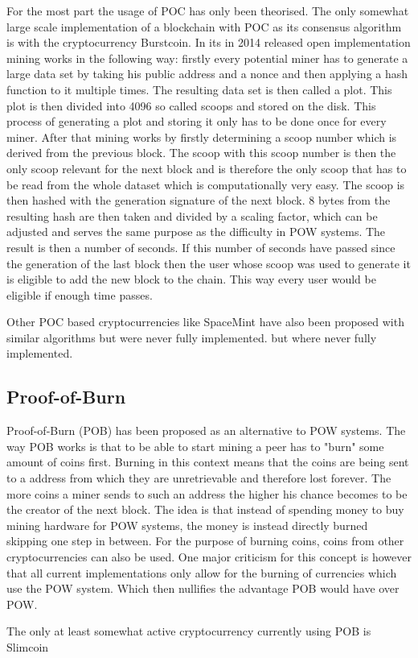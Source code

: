 For the most part the usage of POC has only been theorised. The only somewhat large scale implementation of a blockchain with POC as its consensus algorithm is with the cryptocurrency Burstcoin.
In its in 2014 released open implementation mining works in the following way: firstly every potential miner has to generate a large data set by taking his public address and a nonce and then
applying a hash function to it multiple times. The resulting data set is then called a plot. This plot is then divided into 4096 so called scoops and stored on the disk. This process of generating
a plot and storing it only has to be done once for every miner. After that mining works by firstly determining a scoop number which is derived from the previous block. The scoop with this scoop
number is then the only scoop relevant for the next block and is therefore the only scoop that has to be read from the whole dataset which is computationally very easy. The scoop is then hashed
with the generation signature of the next block. 8 bytes from the resulting hash are then taken and divided by a scaling factor, which can be adjusted and serves the same purpose as the difficulty
in POW systems. The result is then a number of seconds. If this number of seconds have passed since the generation of the last block then the user whose scoop was used to generate it is eligible
to add the new block to the chain. This way every user would be eligible if enough time passes.\cite{url:burstcoin}\par
Other POC based cryptocurrencies like SpaceMint have also been proposed with similar algorithms but were never fully implemented. but where never fully implemented.\cite{url:spacemint}

\subsection{Proof-of-Burn}

Proof-of-Burn (POB) has been proposed as an alternative to POW systems. The way POB works is that to be able to start mining a peer has to "burn" some amount of coins first. Burning in this context
means that the coins are being sent to a address from which they are unretrievable and therefore lost forever. The more coins a miner sends to such an address the higher his chance becomes
to be the creator of the next block. The idea is that instead of spending money to buy mining hardware for POW systems, the money is instead directly burned skipping one step in between.
For the purpose of burning coins, coins from other cryptocurrencies can also be used. One major criticism for this concept is however that all current implementations only allow for the
burning of currencies which use the POW system. Which then nullifies the advantage POB would have over POW.\par
The only at least somewhat active cryptocurrency currently using POB is Slimcoin\cite{url:pob}

